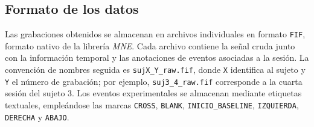 \subsection{Formato de los datos}
\label{subsec:formato}

Las grabaciones obtenidos se almacenan en archivos individuales en formato \texttt{FIF}, formato nativo de la librería \textit{MNE}. Cada archivo contiene la señal cruda junto con la información temporal y las anotaciones de eventos asociadas a la sesión. La convención de nombres seguida es \texttt{sujX\_Y\_raw.fif}, donde \texttt{X} identifica al sujeto y \texttt{Y} el número de grabación; por ejemplo, \texttt{suj3\_4\_raw.fif} corresponde a la cuarta sesión del sujeto 3. Los eventos experimentales se almacenan mediante etiquetas textuales, empleándose las marcas \texttt{CROSS}, \texttt{BLANK}, \texttt{INICIO\_BASELINE}, \texttt{IZQUIERDA}, \texttt{DERECHA} y \texttt{ABAJO}.
